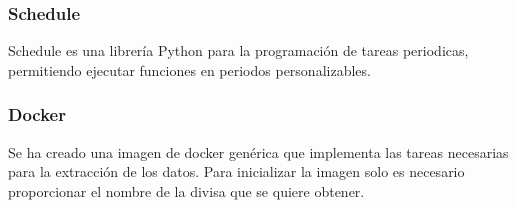 \subsubsection*{Schedule}
Schedule es una librería Python para la programación de tareas periodicas, permitiendo ejecutar funciones en periodos personalizables.

\subsubsection*{Docker}
Se ha creado una imagen de docker genérica que implementa las tareas necesarias para la extracción de los datos. Para inicializar la imagen solo es necesario proporcionar el nombre de la divisa que se quiere obtener. 
\clearpage

